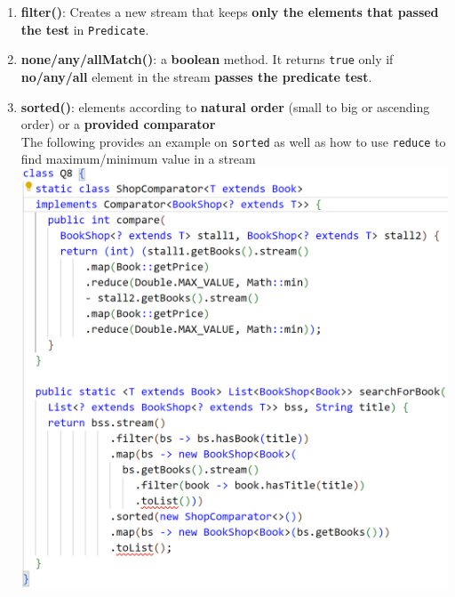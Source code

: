 \documentclass[10pt, landscape]{article}
\begin{document}
\begin{multicols}{4}
\begin{enumerate}
    \item \textbf{filter()}: Creates a new stream that keeps \textbf{only the elements that passed the test} in \texttt{Predicate}.
    \item \textbf{none/any/allMatch()}: a \textbf{boolean} method. It returns \texttt{true} only if \textbf{no/any/all} element in the stream \textbf{passes the predicate test}.
    \item \textbf{sorted()}: elements according to \textbf{natural order} (small to big or ascending order) or a \textbf{provided comparator} \\
    The following provides an example on \texttt{sorted} as well as how to use \texttt{reduce} to find maximum/minimum value in a stream \\
    \includegraphics[width=1\linewidth]{PE/PE2/images/10.png}
\end{enumerate}


\end{multicols}
\end{document}
